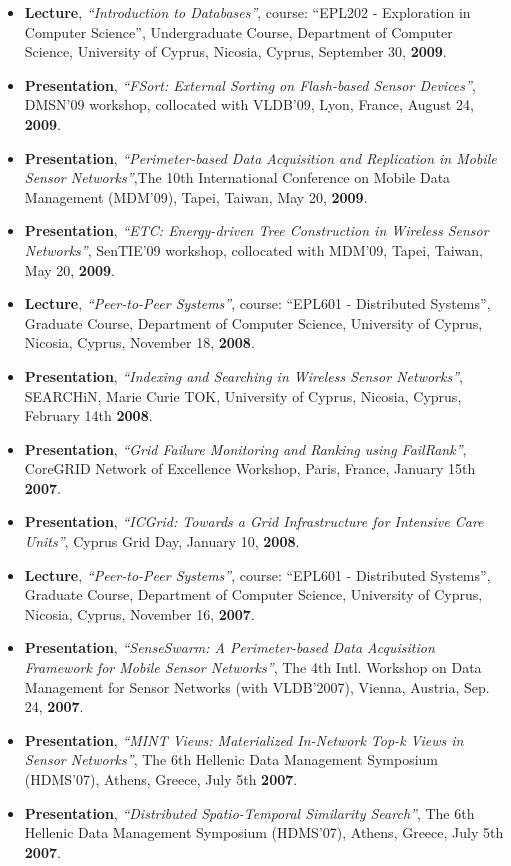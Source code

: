 \documentclass[10pt]{article}
\begin{document}
\begin{itemize}
\item  {\bf Lecture}, {\em ``Introduction to Databases''}, course: ``EPL202 - Exploration in Computer Science'', Undergraduate Course, Department of Computer Science, University of Cyprus,  Nicosia, Cyprus, September 30, {\bf 2009}.
\item  {\bf Presentation}, {\em ``FSort: External Sorting on Flash-based Sensor Devices''}, DMSN'09 workshop, collocated with VLDB'09, Lyon, France, August 24, {\bf 2009}.
\item  {\bf Presentation}, {\em ``Perimeter-based Data Acquisition and Replication in Mobile Sensor Networks''},The 10th International Conference on Mobile Data Management (MDM'09), Tapei, Taiwan, May 20, {\bf 2009}. 
\item  {\bf Presentation}, {\em ``ETC: Energy-driven Tree Construction in Wireless Sensor Networks''}, SenTIE'09 workshop, collocated with MDM'09, Tapei, Taiwan, May 20, {\bf 2009}. 
\item  {\bf Lecture}, {\em ``Peer-to-Peer Systems''}, course: ``EPL601 - Distributed Systems'', Graduate Course, Department of Computer Science, University of Cyprus,  Nicosia, Cyprus, November 18, {\bf 2008}.
\item  {\bf Presentation}, {\em ``Indexing and Searching in Wireless Sensor Networks''}, SEARCHiN, Marie Curie TOK, University of Cyprus, Nicosia, Cyprus, February 14th {\bf 2008}.
\item  {\bf Presentation}, {\em ``Grid Failure Monitoring and Ranking using FailRank''}, CoreGRID Network of Excellence Workshop, Paris, France, January 15th {\bf 2007}.
\item  {\bf Presentation}, {\em ``ICGrid: Towards a Grid Infrastructure for Intensive Care Units''}, Cyprus Grid Day, January 10, {\bf 2008}.
\item  {\bf Lecture}, {\em ``Peer-to-Peer Systems''}, course: ``EPL601 - Distributed Systems'', Graduate Course, Department of Computer Science, University of Cyprus,  Nicosia, Cyprus, November 16, {\bf 2007}.
\item  {\bf Presentation}, {\em ``SenseSwarm: A Perimeter-based Data Acquisition Framework for Mobile Sensor Networks''}, The 4th Intl. Workshop on Data Management for Sensor Networks (with VLDB'2007), Vienna, Austria, Sep. 24, {\bf 2007}. 
\item {\bf  Presentation}, {\em ``MINT Views: Materialized In-Network Top-k Views in Sensor Networks''}, The 6th Hellenic Data Management Symposium (HDMS'07), Athens, Greece, July 5th {\bf 2007}. 
\item  {\bf Presentation}, {\em ``Distributed Spatio-Temporal Similarity Search''}, The 6th Hellenic Data Management Symposium (HDMS'07), Athens, Greece, July 5th {\bf 2007}. 

\end{itemize}
\end{document}
